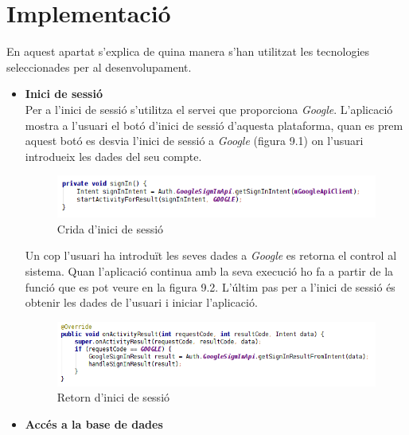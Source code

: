 
\chapter{Implementació} %

\label{Implementacio} %

En aquest apartat s'explica de quina manera s'han utilitzat les tecnologies seleccionades per al desenvolupament.

\begin{itemize}
\item{}\textbf{Inici de sessió}\\

Per a l'inici de sessió s'utilitza el servei que proporciona \textit{Google}. L'aplicació mostra a l'usuari el botó d'inici de sessió d'aquesta plataforma, quan es prem aquest botó es desvia l'inici de sessió a \textit{Google} (figura 9.1) on l'usuari introdueix les dades del seu compte.

\begin{figure}[!h]
\centering
\includegraphics[scale=0.9]{Figures/initSessio1.png}
\caption{Crida d'inici de sessió}
\end{figure}

Un cop l'usuari ha introduït les seves dades a \textit{Google} es retorna el control al sistema. Quan l'aplicació continua amb la seva execució ho fa a partir de la funció que es pot veure en la figura 9.2. L'últim pas per a l'inici de sessió és obtenir les dades de l'usuari i iniciar l'aplicació.

\begin{figure}[!h]
\centering
\includegraphics[scale=0.8]{Figures/initSessio2.png}
\caption{Retorn d'inici de sessió}
\end{figure}

\item{\textbf{Accés a la base de dades}}\\


\end{itemize}
